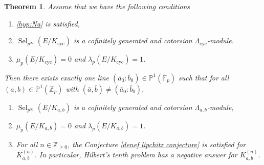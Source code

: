 \documentclass[12pt]{amsart}
\newtheorem{theorem}{Theorem}[section]
\newcommand{\Z}{\mathbb{Z}}
\newcommand{\op}[1]{\operatorname{#1}}
\numberwithin{equation}{section}
\begin{document}
\begin{theorem}\label{main thm 2}
    Assume that we have the following conditions
     \begin{enumerate}
         \item \eqref{hyp:Na} is satisfied, 
        \item $\op{Sel}_{p^\infty}(E/K_{\op{cyc}})$ is a cofinitely generated and cotorsion $\Lambda_{\op{cyc}}$-module.
        \item $\mu_p(E/K_{\op{cyc}})=0$ and $\lambda_p(E/K_{\op{cyc}})=1$.
    \end{enumerate} 
    Then there exists exactly one line $(\bar{a}_0: \bar{b}_0)\in \mathbb{P}^1(\mathbb{F}_p)$ such that for all $(a,b)\in \mathbb{P}^1(\Z_p)$ with $(\bar{a}, \bar{b})\neq (\bar{a}_0: \bar{b}_0)$, 
    \begin{enumerate}
        \item $\op{Sel}_{p^\infty}(E/K_{a,b})$ is a cofinitely generated and cotorsion $\Lambda_{a,b}$-module,
        \item $\mu_p(E/K_{a,b})=0$ and $\lambda_p(E/K_{a,b})=1$.
         \item For all $n\in \Z_{\geq 0}$, the Conjecture \ref{denef lipchitz conjecture} is satisfied for $K_{a,b}^{(n)}$. In particular, Hilbert's tenth problem has a negative answer for $K_{a,b}^{(n)}$.
    \end{enumerate}
\end{theorem}
\end{document}
